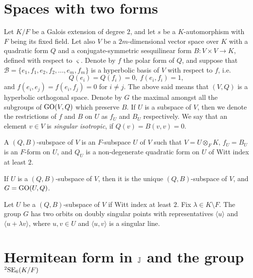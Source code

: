 
\section{Spaces with two forms}

Let $K / F$ be a Galois extension of degree $2$, 
and let $s$ be a $K$-automorphism
with $F$ being its fixed field. Let also $V$ be a $2m$-dimensional vector space over $K$ with 
a quadratic form $Q$ and a conjugate-symmetric sesquilinear form 
\mbox{$B : V\times V \rightarrow K$},
defined with respect to $\varsigma$. Denote by $f$ the polar form of $Q$, and suppose that 
\mbox{$\mathcal{B} = \{ e_1, f_1, e_2, f_2, ..., e_m, f_m \}$}
is a hyperbolic basis of $V$ with respect to $f$, i.e.
\begin{equation}
	Q(e_i) = Q(f_i) = 0,\ f(e_i, f_i) = 1,
\end{equation}
and $f(e_i,e_j) = f(e_i,f_j) = 0$ for $i \neq j$. The above said means that $(V,Q)$ is a hyperbolic
orthogonal space. Denote by $G$ the maximal amongst all the subgroups of 
$\mathrm{GO}(V, Q)$ which preserve $B$. If $U$ 
is a subspace of $V$, then we denote the restrictions of $f$ and $B$ on $U$ as $f_U$ and $B_U$ 
respectively. We say that an element $v \in V$ is \textit{singular isotropic}, if $Q(v) = B(v,v) = 0$. 

\begin{definition}
	A $(Q,B)$-subspace of $V$ is an $F$-subspace $U$ of $V$ such that \mbox{$V = U \otimes_F K$}, 
	$f_U = B_U$ is an $F$-form on $U$, and $Q_U$ is a non-degenerate quadratic form on $U$ of 
	Witt index at least $2$. 
\end{definition}

\begin{proposition}
	\label{prop:3_2forms}
	If $U$ is a $(Q,B)$-subspace of $V$, then it is the unique $(Q,B)$-subspace of $V$, and
	$G = \mathrm{GO}(U,Q)$. 
\end{proposition}

\begin{proposition}
	\label{prop:3_2forms_orbits}
	Let $U$ be a $(Q,B)$-subspace of $V$ if Witt index at least $2$. Fix $\lambda \in K 
	\setminus F$. The group $G$ has two orbits on doubly singular points with representatives
	$\langle u \rangle$ and $\langle u + \lambda v \rangle$, where $u,v \in U$ and 
	$\langle u, v \rangle$ 	is a singular line. 
\end{proposition}

\section{Hermitean form in $\mathbb{J}$ and the group ${}^2\mathrm{SE}_6(K/F)$}

